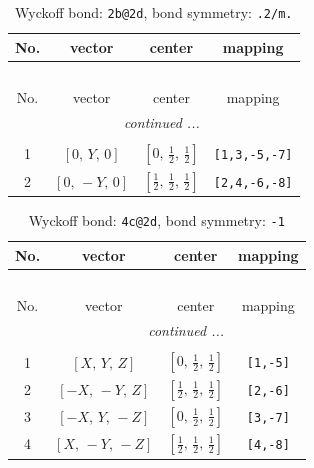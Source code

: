 \documentclass[fleqn,8pt]{jsarticle}
\begin{document}
\renewcommand{\arraystretch}{1.2}
\begin{longtable}{cccc}
\caption{Wyckoff bond: {\tt 2b@2d}, bond symmetry: {\tt .2/m.}}
 \\
 \hline \hline
No. & vector & center & mapping \\ \hline \endfirsthead

\multicolumn{3}{l}{\tablename\ \thetable{}} \\
 \hline \hline
No. & vector & center & mapping \\ \hline \endhead

 \hline \hline
\multicolumn{3}{r}{\footnotesize\it continued ...} \\ \endfoot

 \hline \hline
\multicolumn{3}{r}{} \\ \endlastfoot

1 & $\left[ 0,\, Y,\, 0 \right]$ & $\left[ 0,\, \frac{1}{2},\, \frac{1}{2} \right]$ & {\tt [1,3,-5,-7]} \\ \hline
2 & $\left[ 0,\, - Y,\, 0 \right]$ & $\left[ \frac{1}{2},\, \frac{1}{2},\, \frac{1}{2} \right]$ & {\tt [2,4,-6,-8]} \\
\end{longtable}
\renewcommand{\arraystretch}{1.2}
\begin{longtable}{cccc}
\caption{Wyckoff bond: {\tt 4c@2d}, bond symmetry: {\tt -1}}
 \\
 \hline \hline
No. & vector & center & mapping \\ \hline \endfirsthead

\multicolumn{3}{l}{\tablename\ \thetable{}} \\
 \hline \hline
No. & vector & center & mapping \\ \hline \endhead

 \hline \hline
\multicolumn{3}{r}{\footnotesize\it continued ...} \\ \endfoot

 \hline \hline
\multicolumn{3}{r}{} \\ \endlastfoot

1 & $\left[ X,\, Y,\, Z \right]$ & $\left[ 0,\, \frac{1}{2},\, \frac{1}{2} \right]$ & {\tt [1,-5]} \\ \hline
2 & $\left[ - X,\, - Y,\, Z \right]$ & $\left[ \frac{1}{2},\, \frac{1}{2},\, \frac{1}{2} \right]$ & {\tt [2,-6]} \\ \hline
3 & $\left[ - X,\, Y,\, - Z \right]$ & $\left[ 0,\, \frac{1}{2},\, \frac{1}{2} \right]$ & {\tt [3,-7]} \\ \hline
4 & $\left[ X,\, - Y,\, - Z \right]$ & $\left[ \frac{1}{2},\, \frac{1}{2},\, \frac{1}{2} \right]$ & {\tt [4,-8]} \\
\end{longtable}
\end{document}
